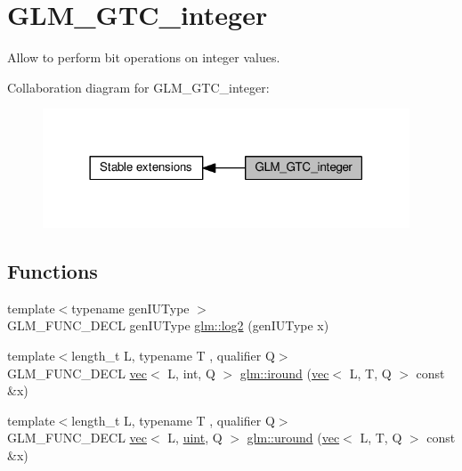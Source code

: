 \hypertarget{group__gtc__integer}{}\section{G\+L\+M\+\_\+\+G\+T\+C\+\_\+integer}
\label{group__gtc__integer}


Allow to perform bit operations on integer values.  


Collaboration diagram for G\+L\+M\+\_\+\+G\+T\+C\+\_\+integer\+:
\nopagebreak
\begin{figure}[H]
\begin{center}
\leavevmode
\includegraphics[width=309pt]{db/dd6/group__gtc__integer}
\end{center}
\end{figure}
\subsection*{Functions}
\begin{DoxyCompactItemize}
\item 
{\footnotesize template$<$typename gen\+I\+U\+Type $>$ }\\G\+L\+M\+\_\+\+F\+U\+N\+C\+\_\+\+D\+E\+CL gen\+I\+U\+Type \hyperlink{group__gtc__integer_ga9bd682e74bfacb005c735305207ec417}{glm\+::log2} (gen\+I\+U\+Type x)
\item 
{\footnotesize template$<$length\+\_\+t L, typename T , qualifier Q$>$ }\\G\+L\+M\+\_\+\+F\+U\+N\+C\+\_\+\+D\+E\+CL \hyperlink{structglm_1_1vec}{vec}$<$ L, int, Q $>$ \hyperlink{group__gtc__integer_ga57824268ebe13a922f1d69a5d37f637f}{glm\+::iround} (\hyperlink{structglm_1_1vec}{vec}$<$ L, T, Q $>$ const \&x)
\item 
{\footnotesize template$<$length\+\_\+t L, typename T , qualifier Q$>$ }\\G\+L\+M\+\_\+\+F\+U\+N\+C\+\_\+\+D\+E\+CL \hyperlink{structglm_1_1vec}{vec}$<$ L, \hyperlink{group__core__precision_ga4fd29415871152bfb5abd588334147c8}{uint}, Q $>$ \hyperlink{group__gtc__integer_ga6715b9d573972a0f7763d30d45bcaec4}{glm\+::uround} (\hyperlink{structglm_1_1vec}{vec}$<$ L, T, Q $>$ const \&x)
\end{DoxyCompactItemize}


